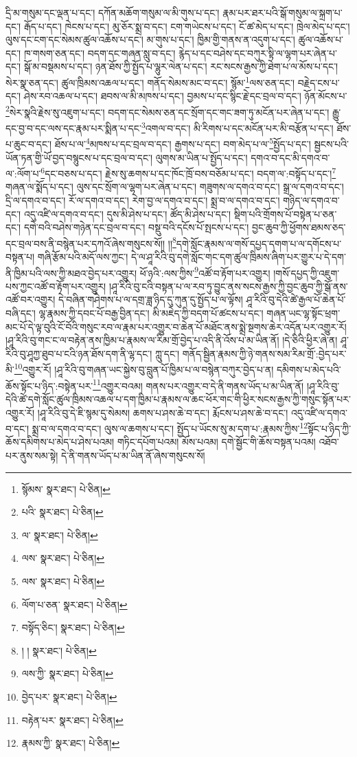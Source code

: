 དྲི་མ་གསུམ་དང་ལྡན་པ་དང་། དཀོན་མཆོག་གསུམ་ལ་མི་གུས་པ་དང་། རྣམ་པར་ཐར་པའི་སྒོ་གསུམ་ལ་སྐྲག་པ་དང་། རྒོད་པ་དང་། ཁེངས་པ་དང་། མུ་ཅོར་སྨྲ་བ་དང་། ངག་གཡེངས་པ་དང་། ངོ་ཚ་མེད་པ་དང་། ཁྲེལ་མེད་པ་དང་། ལུས་དང་ངག་དང་སེམས་ཚུལ་འཆོས་པ་དང་། མ་གུས་པ་དང་། ཁྱིམ་གྱི་གནས་ན་འདུག་པ་དང་། ཚུལ་འཆོས་པ་དང་། ཁ་གསག་ཅན་དང་། བདག་དང་གཞན་སླུ་བ་དང་། རྙེད་པ་དང་བཤེས་དང་བཀུར་སྟི་ལ་ལྷག་པར་ཞེན་པ་དང་། སྒོ་མ་བསྡམས་པ་དང་། ཉན་ཐོས་ཀྱི་སྤྱོད་པ་ལྷུར་ལེན་པ་དང་། རང་སངས་རྒྱས་ཀྱི་ཐེག་པ་ལ་མོས་པ་དང་། སེར་སྣ་ཅན་དང་། ཚུལ་ཁྲིམས་འཆལ་པ་དང་། གནོད་སེམས་མང་བ་དང་། སྙོམ་\footnote{སྙོམས་  སྣར་ཐང་།  པེ་ཅིན། }ལས་ཅན་དང་། བརྗེད་ངས་པ་དང་། ཤེས་རབ་འཆལ་པ་དང་། ཐབས་ལ་མི་མཁས་པ་དང་། བྱམས་པ་དང་སྙིང་རྗེ་དང་བྲལ་བ་དང་། ཉོན་མོངས་པ་\footnote{པའི་  སྣར་ཐང་།  པེ་ཅིན། }སེར་སྣའི་རྗེས་སུ་འཇུག་པ་དང་། བདག་དང་སེམས་ཅན་དང་སྲོག་དང་གང་ཟག་ཏུ་མངོན་པར་ཞེན་པ་དང་། རྒྱུ་དང་བྱ་བ་དང་ལས་དང་རྣམ་པར་སྨིན་པ་དང་\footnote{ལ་  སྣར་ཐང་།  པེ་ཅིན། }འགལ་བ་དང་། མི་རིགས་པ་དང་མངོན་པར་མི་བརྩོན་པ་དང་། ཐོས་པ་ཆུང་བ་དང་། ཐོས་པ་ལ་\footnote{ལས་  སྣར་ཐང་།  པེ་ཅིན། }མཁས་པ་དང་བྲལ་བ་དང་། རྒྱགས་པ་དང་། བག་མེད་པ་ལ་\footnote{ལས་  སྣར་ཐང་།  པེ་ཅིན། }སྤྱོད་པ་དང་། སྦྱངས་པའི་ཡོན་ཏན་གྱི་ཡོ་བྱད་བསྙུངས་པ་དང་བྲལ་བ་དང་། ལུགས་མ་ཡིན་པ་སྤྱོད་པ་དང་། དགའ་བ་དང་མི་དགའ་བ་ལ་:ལོག་པ་\footnote{ལོག་པ་ཅན་  སྣར་ཐང་།  པེ་ཅིན། }དང་བཅས་པ་དང་། རྗེས་སུ་ཆགས་པ་དང་ཁོང་ཁྲོ་བས་བཅོམ་པ་དང་། བདག་ལ་:བསྟོད་པ་དང་།\footnote{བསྟོད་ཅིང་།  སྣར་ཐང་།  པེ་ཅིན། } གཞན་ལ་སྨོད་པ་དང་། ལུས་དང་སྲོག་ལ་ལྷག་པར་ཞེན་པ་དང་། གཟུགས་ལ་དགའ་བ་དང་། སྒྲ་ལ་དགའ་བ་དང་། དྲི་ལ་དགའ་བ་དང་། རོ་ལ་དགའ་བ་དང་། རེག་བྱ་ལ་དགའ་བ་དང་། སྨྲ་བ་ལ་དགའ་བ་དང་། གཉིད་ལ་དགའ་བ་དང་། འདུ་འཛི་ལ་དགའ་བ་དང་། དུས་མི་ཤེས་པ་དང་། ཚོད་མི་ཤེས་པ་དང་། སྡིག་པའི་གྲོགས་པོ་བསྟེན་པ་ཅན་དང་། དགེ་བའི་བཤེས་གཉེན་དང་བྲལ་བ་དང་། བསྡུ་བའི་དངོས་པོ་སྤངས་པ་དང་། བྱང་ཆུབ་ཀྱི་ཕྱོགས་ཐམས་ཅད་དང་བྲལ་བས་ནི་བསྙེན་པར་དཀའོ་ཞེས་གསུངས་སོ།། །།\footnote{། །  སྣར་ཐང་།  པེ་ཅིན། }དགེ་སློང་རྣམས་ལ་གསོ་དཔྱད་དགག་པ་ལ་དགོངས་པ་བསྟན་པ། གཞི་རྩོམ་པའི་མདོ་ལས་ཀྱང་། དེ་ལ་ཤཱ་རིའི་བུ་དགེ་སློང་གང་དག་ཚུལ་ཁྲིམས་ཞིག་པར་གྱུར་པ་དེ་དག་ནི་ཁྱིམ་པའི་ལས་ཀྱི་མཐའ་བྱེད་པར་འགྱུར། ཕོ་ཉའི་:ལས་ཀྱིས་\footnote{ལས་ཀྱི་  སྣར་ཐང་།  པེ་ཅིན། }འཚོ་བ་རྟོག་པར་འགྱུར། །གསོ་དཔྱད་ཀྱི་འཇུག་པས་ཀྱང་འཚོ་བ་རྟོག་པར་འགྱུར། །ཤཱ་རིའི་བུ་ངའི་བསྟན་པ་ལ་རབ་ཏུ་བྱུང་ནས་སངས་རྒྱས་ཀྱི་བྱང་ཆུབ་ཀྱི་སྒོ་ནས་འཚོ་བར་འགྱུར། དེ་བཞིན་གཤེགས་པ་ལ་དགྲ་ཟླ་ཉིད་དུ་ཀུན་དུ་སྤྱོད་པ་ལ་ལྟོས། ཤཱ་རིའི་བུ་དེའི་ཚེ་རྒྱལ་པོ་ཆེན་པོ་བཞི་དང་། ལྷ་རྣམས་ཀྱི་དབང་པོ་བརྒྱ་བྱིན་དང་། མི་མཇེད་ཀྱི་བདག་པོ་ཚངས་པ་དང་། གཞན་ཡང་ལྷ་སྟོང་ཕྲག་མང་པོ་དེ་ལྟ་བུའི་ངོ་བོའི་གསུང་རབ་ལ་རྣམ་པར་འགྱུར་བ་ཆེན་པོ་མཐོང་ནས་སྨྲེ་སྔགས་ཆེར་འདོན་པར་འགྱུར་རོ། །ཤཱ་རིའི་བུ་གང་ང་ལ་བརྟེན་ནས་ཁྱིམ་པ་རྣམས་ལ་རིམ་གྲོ་བྱེད་པ་འདི་ནི་འོས་པ་མ་ཡིན་ནོ། །དེ་ཅིའི་ཕྱིར་ཞེ་ན། ཤཱ་རིའི་བུ་ཤཱཀྱ་ཐུབ་པ་ངའི་ཉན་ཐོས་དག་ནི་ལྷ་དང་། ཀླུ་དང་། གནོད་སྦྱིན་རྣམས་ཀྱི་ཉེ་གནས་སམ་རིམ་གྲོ་:བྱེད་པར་མི་\footnote{བྱེད་པར་  སྣར་ཐང་།  པེ་ཅིན། }འགྱུར་རོ། །ཤཱ་རིའི་བུ་གཞན་ཡང་སྐྱེས་བུ་བླུན་པོ་ཁྱིམ་པ་ལ་བསྙེན་བཀུར་བྱེད་པ་ན། དམིགས་པ་མེད་པའི་ཆོས་སྟོང་པ་ཉིད་:བསྟེན་པར་\footnote{བརྟེན་པར་  སྣར་ཐང་།  པེ་ཅིན། }འགྱུར་བའམ། གནས་པར་འགྱུར་བ་དེ་ནི་གནས་ཡོད་པ་མ་ཡིན་ནོ། །ཤཱ་རིའི་བུ་དེའི་ཚེ་དགེ་སློང་ཚུལ་ཁྲིམས་འཆལ་པ་དག་ཁྱིམ་པ་རྣམས་ལ་ཆང་ཕོར་གང་གི་ཕྱིར་སངས་རྒྱས་ཀྱི་གསུང་སྟོན་པར་འགྱུར་རོ། །ཤཱ་རིའི་བུ་དེ་ཇི་སྙམ་དུ་སེམས། ཆགས་པ་ཤས་ཆེ་བ་དང་། རྨོངས་པ་ཤས་ཆེ་བ་དང་། འདུ་འཛི་ལ་དགའ་བ་དང་། སྨྲ་བ་ལ་དགའ་བ་དང་། ལུས་ལ་ཆགས་པ་དང་། སྤྱོད་པ་ཡོངས་སུ་མ་དག་པ་:རྣམས་ཀྱིས་\footnote{རྣམས་ཀྱི་  སྣར་ཐང་།  པེ་ཅིན། }སྟོང་པ་ཉིད་ཀྱི་ཆོས་དམིགས་པ་མེད་པ་ཤེས་པའམ། གཏིང་དཔོག་པའམ། མོས་པའམ། དགེ་སྦྱོང་གི་ཆོས་བསྟན་པའམ། འཐོབ་པར་ནུས་སམ་སྟེ། དེ་ནི་གནས་ཡོད་པ་མ་ཡིན་ནོ་ཞེས་གསུངས་སོ། 